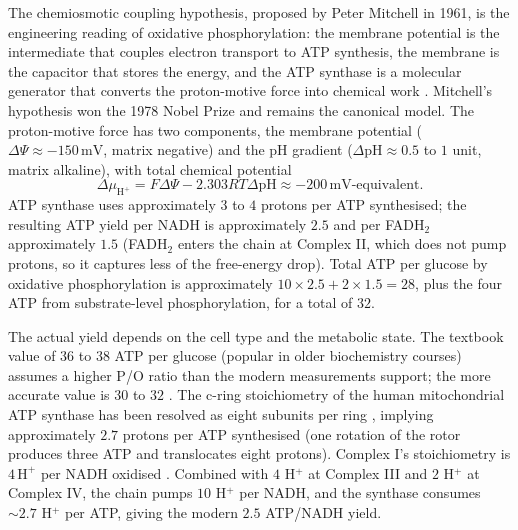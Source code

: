 

The chemiosmotic coupling hypothesis, proposed by Peter Mitchell in
1961, is the engineering reading of oxidative phosphorylation: the
membrane potential is the intermediate that couples electron transport
to ATP synthesis, the membrane is the capacitor that stores the
energy, and the ATP synthase is a molecular generator that converts
the proton-motive force into chemical work
\cite{paper:mitchell1961-chemiosmotic}. Mitchell's hypothesis won
the 1978 Nobel Prize and remains the canonical model. The proton-motive
force has two components, the membrane potential ($\Delta \Psi
\approx -150\,\text{mV}$, matrix negative) and the pH gradient
($\Delta \text{pH} \approx 0.5$ to $1$ unit, matrix alkaline), with
total chemical potential
\[
\Delta \mu_{\text{H}^+} = F \Delta \Psi - 2.303 RT \Delta \text{pH}
\approx -200\,\text{mV}\text{-equivalent}.
\]
ATP synthase uses approximately $3$ to $4$ protons per ATP
synthesised; the resulting ATP yield per NADH is approximately $2.5$
and per FADH$_2$ approximately $1.5$ (FADH$_2$ enters the chain at
Complex II, which does not pump protons, so it captures less of the
free-energy drop). Total ATP per glucose by oxidative phosphorylation
is approximately $10 \times 2.5 + 2 \times 1.5 = 28$, plus the four
ATP from substrate-level phosphorylation, for a total of $32$.

The actual yield depends on the cell type and the metabolic state.
The textbook value of $36$ to $38$ ATP per glucose (popular in older
biochemistry courses) assumes a higher P/O ratio than the modern
measurements support; the more accurate value is $30$ to $32$
\cite[ch.~19]{text:lehninger-biochemistry}. The c-ring stoichiometry
of the human mitochondrial ATP synthase has been resolved as eight
subunits per ring \cite{paper:v6c02-watt-stoichiometry-2010},
implying approximately $2.7$ protons per ATP synthesised (one rotation
of the rotor produces three ATP and translocates eight protons).
Complex I's stoichiometry is $4\,\text{H}^+$ per NADH oxidised
\cite{paper:v6c02-wikstrom-stoichiometry-2012}. Combined with $4$
H$^+$ at Complex III and $2$ H$^+$ at Complex IV, the chain pumps
$10$ H$^+$ per NADH, and the synthase consumes $\sim 2.7$ H$^+$ per
ATP, giving the modern $2.5$ ATP/NADH yield.



